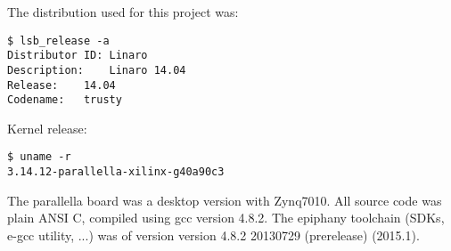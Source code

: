 The distribution used for this project was:

\begin{lstlisting}
$ lsb_release -a
Distributor ID:	Linaro
Description:	Linaro 14.04
Release:	14.04
Codename:	trusty
\end{lstlisting}

Kernel release:

\begin{lstlisting}
$ uname -r
3.14.12-parallella-xilinx-g40a90c3
\end{lstlisting}

The parallella board was a desktop version with Zynq7010. All source code was plain ANSI C, compiled using gcc version 4.8.2. The \gls{epiphany} toolchain (\glspl{SDK}, e-gcc utility, ...) was of version version 4.8.2 20130729 (prerelease) (2015.1).